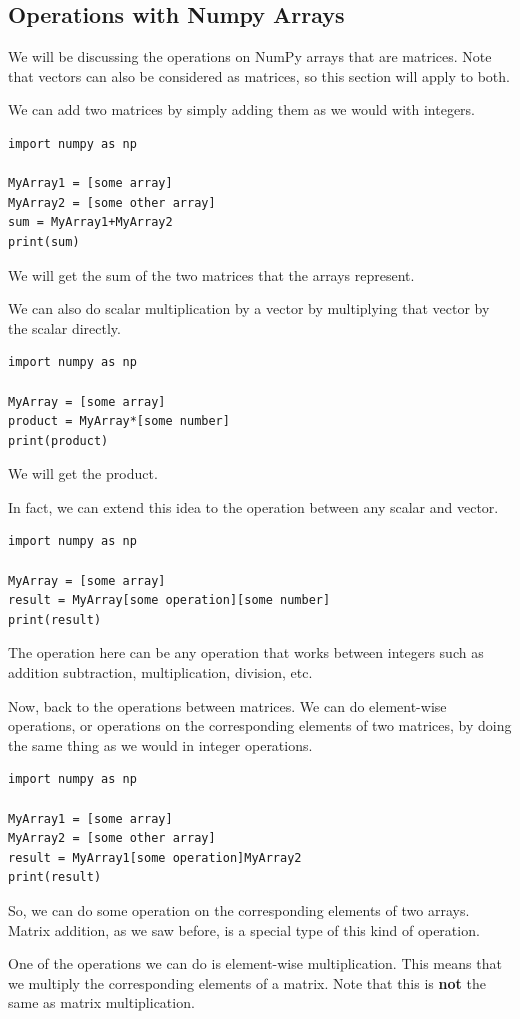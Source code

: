 \documentclass{article}
\begin{document}
\subsection{Operations with Numpy Arrays}
We will be discussing the operations on NumPy arrays that are matrices. Note that vectors can also be considered as matrices, so this section will apply to both.

We can add two matrices by simply adding them as we would with integers. 
\begin{lstlisting}
import numpy as np

MyArray1 = [some array]
MyArray2 = [some other array]
sum = MyArray1+MyArray2
print(sum)
\end{lstlisting}
We will get the sum of the two matrices that the arrays represent.

We can also do scalar multiplication by a vector by multiplying that vector by the scalar directly.
\begin{lstlisting}
import numpy as np

MyArray = [some array]
product = MyArray*[some number]
print(product)
\end{lstlisting}
We will get the product.

In fact, we can extend this idea to the operation between any scalar and vector. 
\begin{lstlisting}
import numpy as np

MyArray = [some array]
result = MyArray[some operation][some number]
print(result)
\end{lstlisting}
The operation here can be any operation that works between integers such as addition subtraction, multiplication, division, etc. 

Now, back to the operations between matrices. We can do element-wise operations, or operations on the corresponding elements of two matrices, by doing the same thing as we would in integer operations.
\begin{lstlisting}
import numpy as np

MyArray1 = [some array]
MyArray2 = [some other array]
result = MyArray1[some operation]MyArray2
print(result)
\end{lstlisting}
So, we can do some operation on the corresponding elements of two arrays. Matrix addition, as we saw before, is a special type of this kind of operation.

One of the operations we can do is element-wise multiplication. This means that we multiply the corresponding elements of a matrix. Note that this is \textbf{not} the same as matrix multiplication. 
\end{document}
